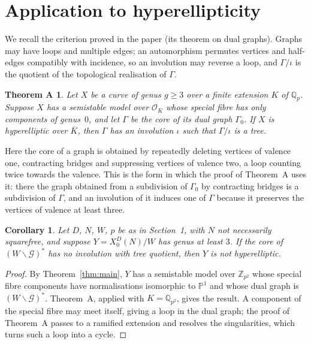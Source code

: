 \documentclass[11pt]{amsart}
\theoremstyle{plain}
\newtheorem{corollary}[theorem]{Corollary}
\newtheorem*{theoremA}{Theorem A}
\theoremstyle{remark}
\newcommand{\Q}{\mathbb{Q}}
\newcommand{\Z}{\mathbb{Z}}
\newcommand{\Qp}{\mathbb{Q}_p}
\begin{document}
\section{Application to hyperellipticity}\label{sec:application}

We recall the criterion proved in the paper (its theorem on dual graphs). Graphs may have loops and multiple edges; an automorphism permutes vertices and half-edges compatibly with incidence, so an involution may reverse a loop, and $\Gamma/\iota$ is the quotient of the topological realisation of $\Gamma$.

\begin{theoremA}
Let $X$ be a curve of genus $g \ge 3$ over a finite extension $K$ of $\Qp$. Suppose $X$ has a semistable model over $\mathcal{O}_K$ whose special fibre has only components of genus~$0$, and let $\Gamma$ be the core of its dual graph $\Gamma_0$. If $X$ is hyperelliptic over $\overline{K}$, then $\Gamma$ has an involution $\iota$ such that $\Gamma/\iota$ is a tree.
\end{theoremA}

Here the core of a graph is obtained by repeatedly deleting vertices of valence one, contracting bridges and suppressing vertices of valence two, a loop counting twice towards the valence. This is the form in which the proof of Theorem~A uses it: there the graph obtained from a subdivision of $\Gamma_0$ by contracting bridges is a subdivision of $\Gamma$, and an involution of it induces one of $\Gamma$ because it preserves the vertices of valence at least three.

\begin{corollary}\label{cor:test}
Let $D$, $N$, $W$, $p$ be as in Section~1, with $N$ not necessarily squarefree, and suppose $Y = X_0^D(N)/W$ has genus at least $3$. If the core of $(W\backslash\mathcal{G})^*$ has no involution with tree quotient, then $Y$ is not hyperelliptic.
\end{corollary}

\begin{proof}
By Theorem~\ref{thm:main}, $Y$ has a semistable model over $\Z_{p^2}$ whose special fibre components have normalisations isomorphic to $\mathbb{P}^1$ and whose dual graph is $(W\backslash\mathcal{G})^*$. Theorem~A, applied with $K = \Q_{p^2}$, gives the result. A component of the special fibre may meet itself, giving a loop in the dual graph; the proof of Theorem~A passes to a ramified extension and resolves the singularities, which turns such a loop into a cycle.
\end{proof}
\end{document}
